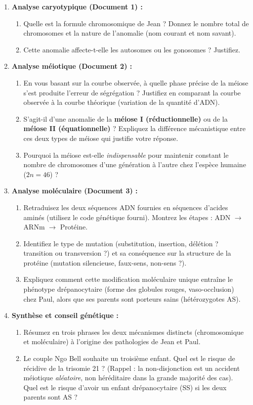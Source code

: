 \documentclass[11pt]{article}
\begin{document}
\begin{enumerate}
\item \textbf{Analyse caryotypique (Document 1) :} 
      \begin{enumerate}
      \item Quelle est la formule chromosomique de Jean ? Donnez le nombre total de chromosomes et la nature de l'anomalie (nom courant et nom savant).
      \item Cette anomalie affecte-t-elle les autosomes ou les gonosomes ? Justifiez.
      \end{enumerate}
\item \textbf{Analyse méiotique (Document 2) :} 
      \begin{enumerate}
      \item En vous basant sur la courbe observée, à quelle phase précise de la méiose s'est produite l'erreur de ségrégation ? Justifiez en comparant la courbe observée à la courbe théorique (variation de la quantité d'ADN).
      \item S'agit-il d'une anomalie de la \textbf{méiose I (réductionnelle)} ou de la \textbf{méiose II (équationnelle)} ? Expliquez la différence mécanistique entre ces deux types de méiose qui justifie votre réponse.
      \item Pourquoi la méiose est-elle \emph{indispensable} pour maintenir constant le nombre de chromosomes d'une génération à l'autre chez l'espèce humaine ($2n=46$) ?
      \end{enumerate}
\item \textbf{Analyse moléculaire (Document 3) :} 
      \begin{enumerate}
      \item Retraduisez les deux séquences ADN fournies en séquences d'acides aminés (utilisez le code génétique fourni). Montrez les étapes : ADN $\to$ ARNm $\to$ Protéine.
      \item Identifiez le type de mutation (substitution, insertion, délétion ? transition ou transversion ?) et sa conséquence sur la structure de la protéine (mutation silencieuse, faux-sens, non-sens ?).
      \item Expliquez comment cette modification moléculaire unique entraîne le phénotype drépanocytaire (forme des globules rouges, vaso-occlusion) chez Paul, alors que ses parents sont porteurs sains (hétérozygotes AS).
      \end{enumerate}
\item \textbf{Synthèse et conseil génétique :} 
      \begin{enumerate}
      \item Résumez en trois phrases les deux mécanismes distincts (chromosomique et moléculaire) à l'origine des pathologies de Jean et Paul.
      \item Le couple Ngo Bell souhaite un troisième enfant. Quel est le risque de récidive de la trisomie 21 ? (Rappel : la non-disjonction est un accident méiotique \emph{aléatoire}, non héréditaire dans la grande majorité des cas). Quel est le risque d'avoir un enfant drépanocytaire (SS) si les deux parents sont AS ?
      \end{enumerate}
\end{enumerate}
\end{document}
